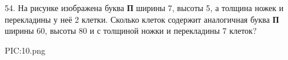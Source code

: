 54. На рисунке изображена буква {\bf П} ширины 7, высоты 5, а толщина ножек и перекладины у неё 2 клетки. Сколько клеток содержит аналогичная буква {\bf П} ширины 60, высоты 80 и с толщиной ножки и перекладины 7 клеток?
\begin{center}
{{PIC:10.png}}
\end{center}
